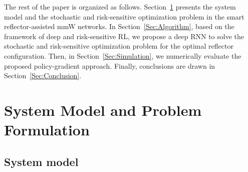\documentclass[conference]{IEEEtran}
\begin{document}
The rest of the paper is organized as follows. Section~\ref{Sec:Sys-Model} presents the system model and the stochastic and risk-sensitive optimization problem in the smart reflector-assisted mmW networks. In Section~\ref{Sec:Algorithm}, based on the framework of deep and risk-sensitive RL, we propose a deep RNN to solve the stochastic and risk-sensitive optimization problem for the optimal reflector configuration. Then, in Section~\ref{Sec:Simulation}, we numerically evaluate the proposed policy-gradient approach. Finally, conclusions are drawn in Section~\ref{Sec:Conclusion}.
\section{System Model and Problem Formulation}\label{Sec:Sys-Model}
\subsection{System model}
\end{document}
